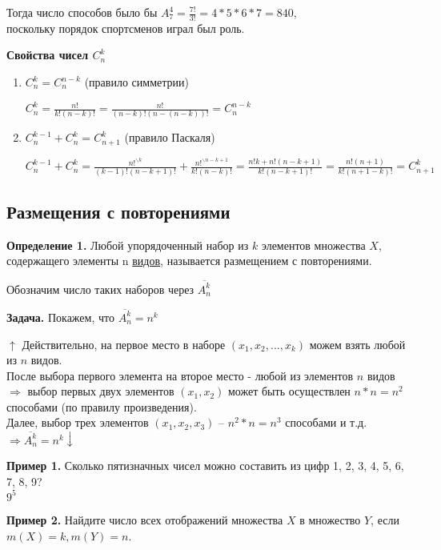 \documentclass{article}
\begin{document}
    Тогда число способов было бы \(A_7^4 = \frac{7!}{3!} = 4*5*6*7 = 840\),
    \\поскольку порядок спортсменов играл был роль.

    \textbf{Свойства чисел \(C_n^k\)}
    \begin{enumerate}
        \item \(C_n^k = C_n^{n-k}\) (правило симметрии)
        
        \(C_n^k = \frac{n!}{k!(n-k)!} = \frac{n!}{(n-k)!(n-(n-k))!} = C_n^{n-k}\)

        \item \(C_n^{k-1} + C_n^k = C_{n+1}^k\) (правило Паскаля)
        
        \(C_n^{k-1} + C_n^k = \frac{n!^{\backslash k}}{(k-1)!(n-k+1)!} + \frac{n!^{\backslash n-k+1}}{k!(n-k)!} = \frac{n!k+n!(n-k+1)}{k!(n-k+1)!} = \frac{n!(n+1)}{k!(n+1-k)!} = C_{n+1}^k\)
    \end{enumerate}

    \subsection{Размещения с повторениями}

    \textbf{Определение 1.} Любой упорядоченный набор из \(k\) элементов множества \(X\), содержащего элементы n \underline{видов}, называется размещением с повторениями.

    Обозначим число таких наборов через \(\overline{A_n^k}\)

    \textbf{Задача.} Покажем, что \(\overline{A_n^k} = n^k\)

    \(\uparrow\) Действительно, на первое место в наборе \((x_1, x_2, ..., x_k)\) можем взять любой из \(n\) видов.
    \\После выбора первого элемента на второе место - любой из элементов \(n\) видов \(\Rightarrow\) выбор первых двух элементов \((x_1, x_2)\) может быть осуществлен \(n*n=n^2\) способами (по правилу произведения).
    \\Далее, выбор трех элементов \((x_1, x_2, x_3)\) -- \(n^2*n=n^3\) способами и т.д. \(\Rightarrow \overline{A_n^k} = n^k \downarrow\)

    \textbf{Пример 1.} Сколько пятизначных чисел можно составить из цифр 1, 2, 3, 4, 5, 6, 7, 8, 9?
    \\\(9^5\)

    \textbf{Пример 2.} Найдите число всех отображений множества \(X\) в множество \(Y\), если \(m(X) = k, m(Y) = n\).
\end{document}
